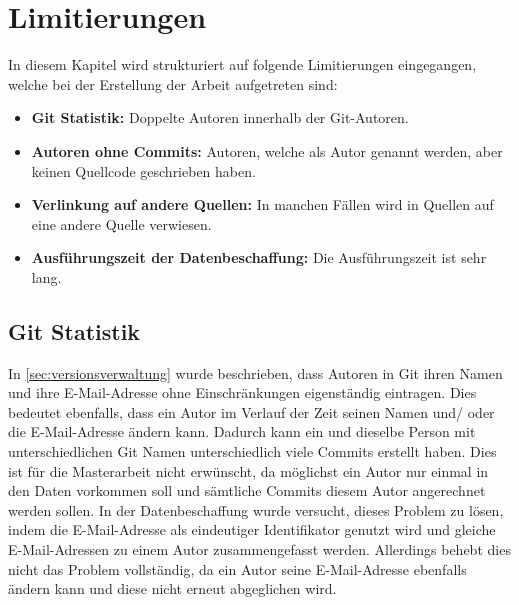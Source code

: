 \section{Limitierungen}
\label{sec:limitierungen}
In diesem Kapitel wird strukturiert auf folgende Limitierungen eingegangen, welche bei der Erstellung der Arbeit aufgetreten sind:
\begin{itemize}
    \item \textbf{Git Statistik:} Doppelte Autoren innerhalb der Git-Autoren.
    \item \textbf{Autoren ohne Commits:} Autoren, welche als Autor genannt werden, aber keinen Quellcode geschrieben haben.
    \item \textbf{Verlinkung auf andere Quellen:} In manchen Fällen wird in Quellen auf eine andere Quelle verwiesen.
    \item \textbf{Ausführungszeit der Datenbeschaffung:} Die Ausführungszeit ist sehr lang.
\end{itemize}

\subsection*{Git Statistik}
\label{sec:git_statistik}
In \autoref{sec:versionsverwaltung} wurde beschrieben, dass Autoren in Git ihren Namen und ihre E-Mail-Adresse ohne Einschränkungen eigenständig eintragen.
Dies bedeutet ebenfalls, dass ein Autor im Verlauf der Zeit seinen Namen und/ oder die E-Mail-Adresse ändern kann.
Dadurch kann ein und dieselbe Person mit unterschiedlichen Git Namen unterschiedlich viele Commits erstellt haben.
Dies ist für die Masterarbeit nicht erwünscht, da möglichst ein Autor nur einmal in den Daten vorkommen soll und sämtliche Commits diesem Autor angerechnet werden sollen.
In der Datenbeschaffung wurde versucht, dieses Problem zu lösen, indem die E-Mail-Adresse als eindeutiger Identifikator genutzt wird und gleiche E-Mail-Adressen zu einem Autor zusammengefasst werden.
Allerdings behebt dies nicht das Problem vollständig, da ein Autor seine E-Mail-Adresse ebenfalls ändern kann und diese nicht erneut abgeglichen wird.

